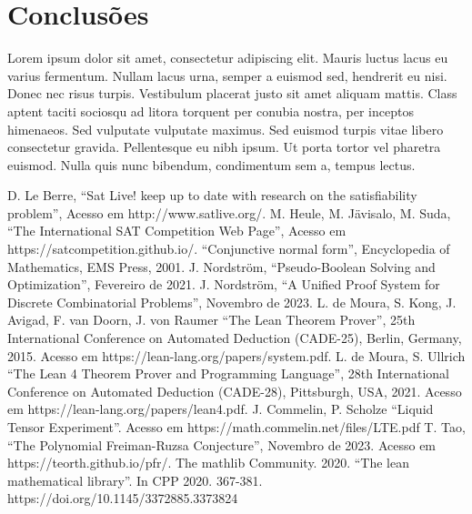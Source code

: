 \documentclass[conference]{IEEEtran}
\begin{document}
\section*{Conclusões}
Lorem ipsum dolor sit amet, consectetur adipiscing elit. Mauris luctus lacus eu varius fermentum. Nullam lacus urna, semper a euismod sed, hendrerit eu nisi. Donec nec risus turpis. Vestibulum placerat justo sit amet aliquam mattis. Class aptent taciti sociosqu ad litora torquent per conubia nostra, per inceptos himenaeos. Sed vulputate vulputate maximus. Sed euismod turpis vitae libero consectetur gravida. Pellentesque eu nibh ipsum. Ut porta tortor vel pharetra euismod. Nulla quis nunc bibendum, condimentum sem a, tempus lectus.

\begin{thebibliography}{00}
           D. Le Berre, ``Sat Live! keep up to date with research on the satisfiability problem'', Acesso em http://www.satlive.org/.
           M. Heule, M. Jävisalo, M. Suda, ``The International SAT Competition Web Page'', Acesso em https://satcompetition.github.io/.
               ``Conjunctive normal form'', Encyclopedia of Mathematics, EMS Press, 2001.
           J. Nordström, ``Pseudo-Boolean Solving and Optimization'', Fevereiro de 2021.
          J. Nordström, ``A Unified Proof System for Discrete Combinatorial Problems'', Novembro de 2023.
        L. de Moura, S. Kong, J. Avigad, F. van Doorn, J. von Raumer ``The Lean Theorem Prover'', 25th International Conference on Automated Deduction (CADE-25), Berlin, Germany, 2015. Acesso em https://lean-lang.org/papers/system.pdf.
             L. de Moura, S. Ullrich ``The Lean 4 Theorem Prover and Programming Language'', 28th International Conference on Automated Deduction (CADE-28), Pittsburgh, USA, 2021. Acesso em https://lean-lang.org/papers/lean4.pdf.
               J. Commelin, P. Scholze ``Liquid Tensor Experiment''. Acesso em https://math.commelin.net/files/LTE.pdf
               T. Tao, ``The Polynomial Freiman-Ruzsa Conjecture'', Novembro de 2023. Acesso em https://teorth.github.io/pfr/.
          The mathlib Community. 2020. ``The lean mathematical library''. In CPP 2020. 367-381. https://doi.org/10.1145/3372885.3373824
\end{thebibliography}

\vspace{12pt}
\end{document}
